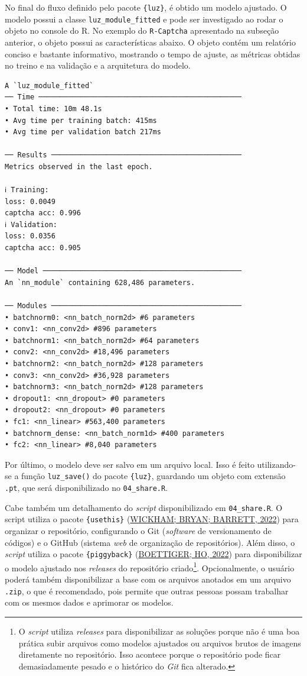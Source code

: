 \documentclass[12pt,twoside,brazilian]{book}
\begin{document}
No final do fluxo definido pelo pacote \texttt{\{luz\}}, é obtido um
modelo ajustado. O modelo possui a classe \texttt{luz\_module\_fitted} e
pode ser investigado ao rodar o objeto no console do R. No exemplo do
\texttt{R-Captcha} apresentado na subseção anterior, o objeto possui as
características abaixo. O objeto contém um relatório conciso e bastante
informativo, mostrando o tempo de ajuste, as métricas obtidas no treino
e na validação e a arquitetura do modelo.

\begin{verbatim}
A `luz_module_fitted`
── Time ────────────────────────────────────────────────
• Total time: 10m 48.1s
• Avg time per training batch: 415ms
• Avg time per validation batch 217ms

── Results ─────────────────────────────────────────────
Metrics observed in the last epoch.

ℹ Training:
loss: 0.0049
captcha acc: 0.996
ℹ Validation:
loss: 0.0356
captcha acc: 0.905

── Model ───────────────────────────────────────────────
An `nn_module` containing 628,486 parameters.

── Modules ─────────────────────────────────────────────
• batchnorm0: <nn_batch_norm2d> #6 parameters
• conv1: <nn_conv2d> #896 parameters
• batchnorm1: <nn_batch_norm2d> #64 parameters
• conv2: <nn_conv2d> #18,496 parameters
• batchnorm2: <nn_batch_norm2d> #128 parameters
• conv3: <nn_conv2d> #36,928 parameters
• batchnorm3: <nn_batch_norm2d> #128 parameters
• dropout1: <nn_dropout> #0 parameters
• dropout2: <nn_dropout> #0 parameters
• fc1: <nn_linear> #563,400 parameters
• batchnorm_dense: <nn_batch_norm1d> #400 parameters
• fc2: <nn_linear> #8,040 parameters
\end{verbatim}

Por último, o modelo deve ser salvo em um arquivo local. Isso é feito
utilizando-se a função \texttt{luz\_save()} do pacote \texttt{\{luz\}},
guardando um objeto com extensão \texttt{.pt}, que será disponibilizado
no \texttt{04\_share.R}.

Cabe também um detalhamento do \emph{script} disponibilizado em
\texttt{04\_share.R}. O script utiliza o pacote \texttt{\{usethis\}}
(\protect\hyperlink{ref-usethis}{WICKHAM; BRYAN; BARRETT, 2022}) para
organizar o repositório, configurando o Git (\emph{software} de
versionamento de códigos) e o GitHub (sistema \emph{web} de organização
de repositórios). Além disso, o \emph{script} utiliza o pacote
\texttt{\{piggyback\}} (\protect\hyperlink{ref-piggyback}{BOETTIGER; HO,
2022}) para disponibilizar o modelo ajustado nos \emph{releases} do
repositório criado\footnote{O \emph{script} utiliza \emph{releases} para
  disponibilizar as soluções porque não é uma boa prática subir arquivos
  como modelos ajustados ou arquivos brutos de imagens diretamente no
  repositório. Isso acontece porque o repositório pode ficar
  demasiadamente pesado e o histórico do \emph{Git} fica alterado.}.
Opcionalmente, o usuário poderá também disponibilizar a base com os
arquivos anotados em um arquivo \texttt{.zip}, o que é recomendado, pois
permite que outras pessoas possam trabalhar com os mesmos dados e
aprimorar os modelos.
\end{document}
